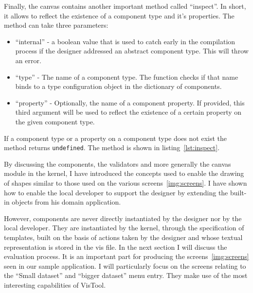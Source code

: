 Finally, the canvas contains another important method called ``inspect''. In short, it allows to reflect the existence of a component type and it's properties. The method can take three parameters:
\begin{itemize}
    \item ``internal'' - a boolean value that is used to catch early in the compilation process if the designer addressed an abstract component type. This will throw an error.
    \item ``type'' - The name of a component type. The function checks if that name binds to a type configuration object in the dictionary of components.
    \item ``property'' - Optionally, the name of a component property. If provided, this third argument will be used to reflect the existence of a certain property on the given component type.
\end{itemize}
If a component type or a property on a component type does not exist the method returns \texttt{undefined}. The method is shown in listing~\ref{lst:inspect}.

By discussing the components, the validators and more generally the canvas module in the kernel, I have introduced the concepts used to enable the drawing of shapes similar to those used on the various screens~\ref{img:screens}. I have shown how to enable the local developer to support the designer by extending the built-in objects from his domain application. 

However, components are never directly instantiated by the designer nor by the local developer. They are instantiated by the kernel, through the specification of templates, built on the basis of actions taken by the designer and whose textual representation is stored in the vis file. In the next section I will discuss the evaluation process. It is an important part for producing the screens~\ref{img:screens} seen in our sample application. I will particularly focus on the screens relating to the ``Small dataset'' and ``bigger dataset'' menu entry. They make use of the most interesting capabilities of VisTool.